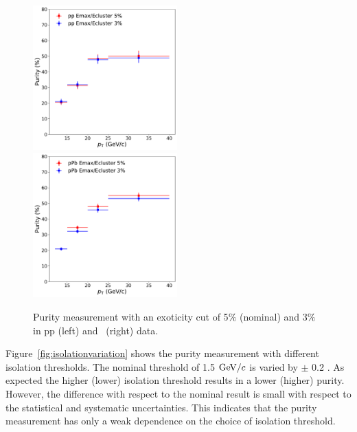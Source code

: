 \begin{figure}
	\center
	\includegraphics[width=0.495\textwidth]{Checks_Systematics/ppemax.pdf}
	\includegraphics[width=0.495\textwidth]{Checks_Systematics/ppbemax.pdf}
	\caption{Purity measurement with an exoticity cut of 5$\%$ (nominal) and 3$\%$ in pp (left) and \pPb~(right) data.}
	\label{fig:exoticity}
\end{figure}

Figure~\ref{fig:isolationvariation} shows the purity measurement with different isolation thresholds. The nominal threshold of 1.5 $\mathrm{GeV}/c$ is varied by $\pm$ 0.2 \GeVc. As expected the higher (lower) isolation threshold results in a lower (higher) purity. However, the difference with respect to the nominal result is small with respect to the statistical and systematic uncertainties. This indicates that the purity measurement has only a weak dependence on the choice of isolation threshold. 



